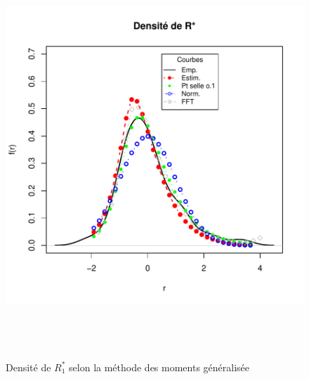 \begin{figure}[!ht]
  \centering
  \includegraphics[height=6in,
  width=6in]{./graphiques/ABBEYN-densiteGALmu-7.pdf}
  \caption{Densité de $R_1^{*}$ selon la méthode des moments
    généralisée}
  \label{fig:densite1R1}
\end{figure}

